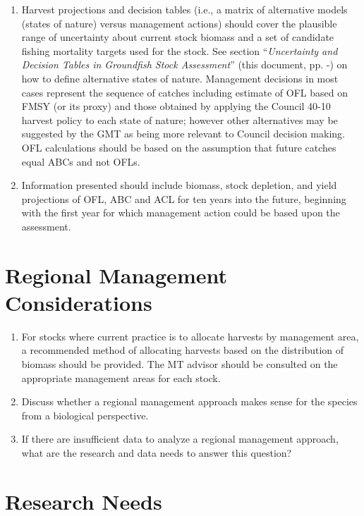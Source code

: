 \documentclass[12pt,]{article}
\begin{document}
\begin{enumerate}
\def\labelenumi{\arabic{enumi}.}
\item
  Harvest projections and decision tables (i.e., a matrix of alternative
  models (states of nature) versus management actions) should cover the
  plausible range of uncertainty about current stock biomass and a set
  of candidate fishing mortality targets used for the stock. See section
  ``\textit{Uncertainty and Decision Tables in Groundfish Stock Assessment}''
  (this document, pp.
  \pageref{sec:uncertainty}-\pageref{sec:uncertaintylast}) on how to
  define alternative states of nature. Management decisions in most
  cases represent the sequence of catches including estimate of OFL
  based on FMSY (or its proxy) and those obtained by applying the
  Council 40-10 harvest policy to each state of nature; however other
  alternatives may be suggested by the GMT as being more relevant to
  Council decision making. OFL calculations should be based on the
  assumption that future catches equal ABCs and not OFLs.
\item
  Information presented should include biomass, stock depletion, and
  yield projections of OFL, ABC and ACL for ten years into the future,
  beginning with the first year for which management action could be
  based upon the assessment.
\end{enumerate}

\section{Regional Management
Considerations}\label{regional-management-considerations}

\begin{enumerate}
\def\labelenumi{\arabic{enumi}.}
\item
  For stocks where current practice is to allocate harvests by
  management area, a recommended method of allocating harvests based on
  the distribution of biomass should be provided. The MT advisor should
  be consulted on the appropriate management areas for each stock.
\item
  Discuss whether a regional management approach makes sense for the
  species from a biological perspective.
\item
  If there are insufficient data to analyze a regional management
  approach, what are the research and data needs to answer this
  question?
\end{enumerate}

\section{Research Needs}\label{research-needs}
\end{document}
